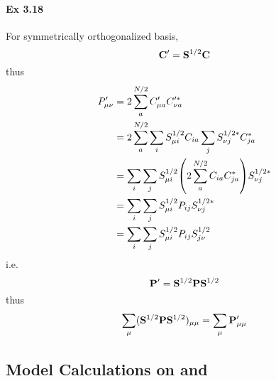 \documentclass[a4paper]{article}
\newcommand{\ex}[1]{\paragraph{Ex #1}}
\numberwithin{equation}{subsection}
\begin{document}
\ex{3.18}
For symmetrically orthogonalized basis,
\begin{equation}\label{key}
\vb{C}' = \vb{S}^{1/2}\vb{C}
\end{equation}
thus
\begin{align}
P'_{\mu\nu} &=  2\sum_a^{N/2} C'_{\mu a}C'^*_{\nu a} \notag\\
&=  2\sum_a^{N/2}  \sum_i S^{1/2}_{\mu i} C_{i a} \sum_j S^{1/2*}_{\nu j} C^*_{ja}  \notag\\
&=  \sum_i\sum_j  S^{1/2}_{\mu i} \qty( 2\sum_a^{N/2} C_{i a} C^*_{ja} ) S^{1/2*}_{\nu j}  \notag\\
&= \sum_i\sum_j  S^{1/2}_{\mu i} P_{ij} S^{1/2*}_{\nu j}  \notag\\
&= \sum_i\sum_j  S^{1/2}_{\mu i} P_{ij} S^{1/2}_{j\nu}
\end{align}
i.e.
\begin{equation}\label{key}
\vb{P}' = \vb{S}^{1/2} \vb{P} \vb{S}^{1/2}
\end{equation}
thus
\begin{equation}\label{key}
\sum_\mu (\vb{S}^{1/2} \vb{P} \vb{S}^{1/2})_{\mu\mu} = \sum_\mu \vb{P}'_{\mu\mu}
\end{equation}

\subsection{Model Calculations on  and }
\end{document}
